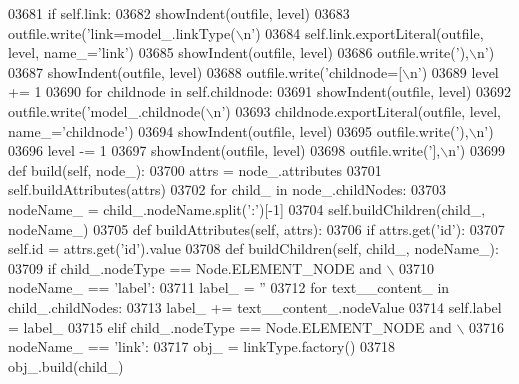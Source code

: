 \begin{DoxyCode}
{{{{{{{{{{{{{{{{{{{{{{{{{{{{{{{{{{{{{{{{{{{{{{{{{{{{{{{{{{{{{{{{{{{{{{{{{{{{{{{{{{{{{{{{{{{{{{{{{{{{{{{{{{{{{{{{{{{{{{{{{{{{{{{{{{{{{{{{{{{{{{{{{{{{{{{{{{{{{{{{{{{{{{{{{{{{{{{{{{{{{{{{{{{{{{{{{{{{{{{{{{{{{{{{{{{{{{{{{{{{{{{{{{{{{{{{{{{{{{03681         \textcolor{keywordflow}{if} self.link:
03682             showIndent(outfile, level)
03683             outfile.write(\textcolor{stringliteral}{'link=model\_.linkType(\(\backslash\)n'})
03684             self.link.exportLiteral(outfile, level, name\_=\textcolor{stringliteral}{'link'})
03685             showIndent(outfile, level)
03686             outfile.write(\textcolor{stringliteral}{'),\(\backslash\)n'})
03687         showIndent(outfile, level)
03688         outfile.write(\textcolor{stringliteral}{'childnode=[\(\backslash\)n'})
03689         level += 1
03690         \textcolor{keywordflow}{for} childnode \textcolor{keywordflow}{in} self.childnode:
03691             showIndent(outfile, level)
03692             outfile.write(\textcolor{stringliteral}{'model\_.childnode(\(\backslash\)n'})
03693             childnode.exportLiteral(outfile, level, name\_=\textcolor{stringliteral}{'childnode'})
03694             showIndent(outfile, level)
03695             outfile.write(\textcolor{stringliteral}{'),\(\backslash\)n'})
03696         level -= 1
03697         showIndent(outfile, level)
03698         outfile.write(\textcolor{stringliteral}{'],\(\backslash\)n'})
03699     \textcolor{keyword}{def }build(self, node\_):
03700         attrs = node\_.attributes
03701         self.buildAttributes(attrs)
03702         \textcolor{keywordflow}{for} child\_ \textcolor{keywordflow}{in} node\_.childNodes:
03703             nodeName\_ = child\_.nodeName.split(\textcolor{stringliteral}{':'})[-1]
03704             self.buildChildren(child\_, nodeName\_)
03705     \textcolor{keyword}{def }buildAttributes(self, attrs):
03706         \textcolor{keywordflow}{if} attrs.get(\textcolor{stringliteral}{'id'}):
03707             self.id = attrs.get(\textcolor{stringliteral}{'id'}).value
03708     \textcolor{keyword}{def }buildChildren(self, child\_, nodeName\_):
03709         \textcolor{keywordflow}{if} child\_.nodeType == Node.ELEMENT\_NODE \textcolor{keywordflow}{and} \(\backslash\)
03710             nodeName\_ == \textcolor{stringliteral}{'label'}:
03711             label\_ = \textcolor{stringliteral}{''}
03712             \textcolor{keywordflow}{for} text\_\_content\_ \textcolor{keywordflow}{in} child\_.childNodes:
03713                 label\_ += text\_\_content\_.nodeValue
03714             self.label = label\_
03715         \textcolor{keywordflow}{elif} child\_.nodeType == Node.ELEMENT\_NODE \textcolor{keywordflow}{and} \(\backslash\)
03716             nodeName\_ == \textcolor{stringliteral}{'link'}:
03717             obj\_ = linkType.factory()
03718             obj\_.build(child\_)
}}}}}}}}}}}}}}}}}}}}}}}}}}}}}}}}}}}}}}}}}}}}}}}}}}}}}}}}}}}}}}}}}}}}}}}}}}}}}}}}}}}}}}}}}}}}}}}}}}}}}}}}}}}}}}}}}}}}}}}}}}}}}}}}}}}}}}}}}}}}}}}}}}}}}}}}}}}}}}}}}}}}}}}}}}}}}}}}}}}}}}}}}}}}}}}}}}}}}}}}}}}}}}}}}}}}}}}}}}}}}}}}}}}}}}}}}}}}}}
\end{DoxyCode}
